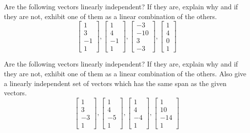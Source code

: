 \documentclass{ximera}
\begin{document}
\begin{problem}\label{prb:3.19} Are the following vectors linearly independent? If they are, explain
why and if they are not, exhibit one of them as a linear combination of the
others.
\begin{equation*}
\left[
\begin{array}{r}
1 \\
3 \\
-1 \\
1
\end{array}
\right] ,\left[
\begin{array}{r}
1 \\
4 \\
-1 \\
1
\end{array}
\right] ,\left[
\begin{array}{r}
-3 \\
-10 \\
3 \\
-3
\end{array}
\right] ,\left[
\begin{array}{r}
1 \\
4 \\
0 \\
1
\end{array}
\right]
\end{equation*}
\end{problem}

\begin{problem}\label{prb:3.20} Are the following vectors linearly independent? If they are, explain
why and if they are not, exhibit one of them as a linear combination of the
others. Also give a linearly independent set of vectors which has the same
span as the given vectors.
\begin{equation*}
\left[
\begin{array}{r}
1 \\
3 \\
-3 \\
1
\end{array}
\right] ,\left[
\begin{array}{r}
1 \\
4 \\
-5 \\
1
\end{array}
\right] ,\left[
\begin{array}{r}
1 \\
4 \\
-4 \\
1
\end{array}
\right] ,\left[
\begin{array}{r}
1 \\
10 \\
-14 \\
1
\end{array}
\right]
\end{equation*}
\end{problem}
\end{document}
